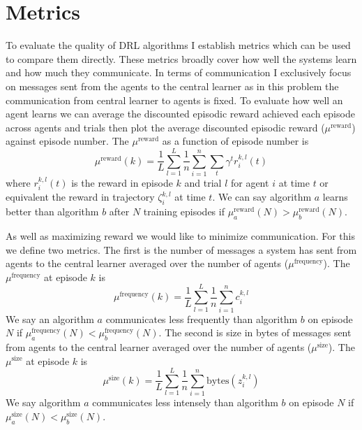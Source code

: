 \section{Metrics}
\label{sec:Metrics}
To evaluate the quality of DRL algorithms I establish metrics which can be used to compare them directly. These metrics broadly cover how well the systems learn and how much they communicate. In terms of communication I exclusively focus on messages sent from the agents to the central learner as in this problem the communication from central learner to agents is fixed. To evaluate how well an agent learns we can average the discounted episodic reward achieved each episode across agents and trials then plot the average discounted episodic reward ($\mu^{\text{reward}}$) against episode number. The $\mu^{\text{reward}}$ as a function of episode number is 
\begin{equation*}
    \mu^{\text{reward}}(k) = \frac{1}{L} \sum_{l=1}^L \frac{1}{n} \sum_{i=1}^n \sum_{t} \gamma^t r^{k,l}_i(t)
\end{equation*}
where $r^{k,l}_i(t)$ is the reward in episode $k$ and trial $l$ for agent $i$ at time $t$ or equivalent the reward in trajectory $\zeta^{k,l}_i$ at time $t$.
We can say algorithm $a$ learns better than algorithm $b$ after $N$ training episodes if $\mu^{\text{reward}}_a(N) > \mu^{\text{reward}}_b(N)$.

As well as maximizing reward we would like to minimize communication. For this we define two metrics. The first is the number of messages a system has sent from agents to the central learner averaged over the number of agents ($\mu^{\text{frequency}}$). The $\mu^{\text{frequency}}$ at episode $k$  is
\begin{equation*}
    \mu^{\text{frequency}}(k) = \frac{1}{L} \sum_{l=1}^L \frac{1}{n} \sum_{i=1}^n c_i^{k,l}
\end{equation*} 
We say an algorithm $a$ communicates less frequently than algorithm $b$ on episode $N$ if $\mu^{\text{frequency}}_a(N) < \mu^{\text{frequency}}_b(N)$. The second is size in bytes of messages sent from agents to the central learner averaged over the number of agents ($\mu^{\text{size}}$). The $\mu^{\text{size}}$ at episode $k$ is 
\begin{equation*}
    \mu^{\text{size}}(k) = \frac{1}{L} \sum_{l=1}^L \frac{1}{n} \sum_{i=1}^n \text{bytes}(z_i^{k,l})
\end{equation*}  
We say algorithm $a$ communicates less intensely than algorithm $b$ on episode $N$ if $\mu^{\text{size}}_a(N) < \mu^{\text{size}}_b(N)$.


